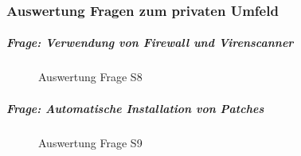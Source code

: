 \documentclass[../../main.tex]{subfiles}
\begin{document}
\subsubsection*{Auswertung Fragen zum privaten Umfeld}

\subparagraph*{Frage: Verwendung von Firewall und Virenscanner}\mbox{}
\begin{figure}[H]
\centering
{}
\caption{Auswertung Frage S8}
\label{S8}
\end{figure}

\subparagraph*{Frage: Automatische Installation von Patches}\mbox{}
\begin{figure}[H]
\centering
{}
\caption{Auswertung Frage S9}
\label{S9}
\end{figure}
\end{document}

